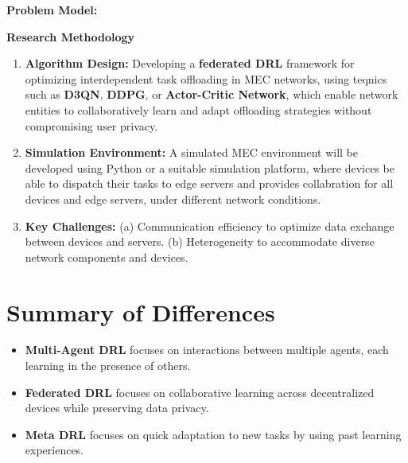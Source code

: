 \documentclass[12pt]{article}
\begin{document}
\vspace{3mm}

\noindent\textbf{\large Problem Model: } 
\noindent



\vspace{5mm}

\noindent\textbf{\large Research Methodology}

\begin{enumerate} \item \textbf{Algorithm Design:} Developing a  \textbf{federated DRL} framework for optimizing interdependent task offloading in MEC networks, using teqnics such as \textbf{D3QN},  \textbf{DDPG}, or  \textbf{Actor-Critic Network}, which enable network entities to collaboratively learn and adapt offloading strategies without compromising user privacy. \item \textbf{Simulation Environment:} A simulated MEC environment will be developed using Python or a suitable simulation platform, where devices be able to dispatch their tasks to edge servers and provides collabration for all devices and edge servers, under different network conditions. 
	
	
	\item \textbf{Key Challenges:} (a) Communication efficiency to optimize data exchange between devices and servers.  (b) Heterogeneity to accommodate diverse network components and devices.
\end{enumerate}



\section{Summary of Differences} \begin{itemize} \item \textbf{Multi-Agent DRL} focuses on interactions between multiple agents, each learning in the presence of others. \item \textbf{Federated DRL} focuses on collaborative learning across decentralized devices while preserving data privacy. \item \textbf{Meta DRL} focuses on quick adaptation to new tasks by using past learning experiences. \end{itemize}





\end{document}
